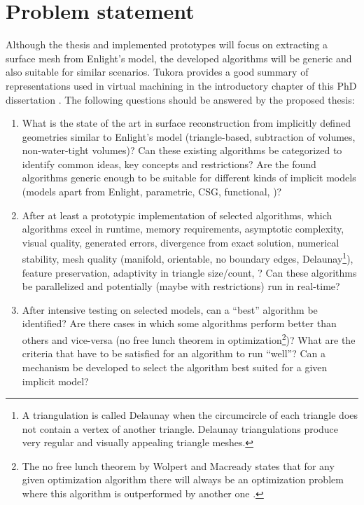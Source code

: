 
\section{Problem statement}

Although the thesis and implemented prototypes will focus on extracting a surface mesh from Enlight's model, the developed algorithms will be generic and also suitable for similar scenarios. Tukora provides a good summary of representations used in virtual machining in the introductory chapter of this PhD dissertation \cite{virtual_machining_review}.
The following questions should be answered by the proposed thesis:

\begin{enumerate}
	\item What is the state of the art in surface reconstruction from implicitly defined geometries similar to Enlight's model (triangle-based, subtraction of volumes, non-water-tight volumes)? Can these existing algorithms be categorized to identify common ideas, key concepts and restrictions? Are the found algorithms generic enough to be suitable for different kinds of implicit models (models apart from Enlight, parametric, CSG, functional, \etc)?
	
	\item After at least a prototypic implementation of selected algorithms, which algorithms excel in runtime, memory requirements, asymptotic complexity, visual quality, generated errors, divergence from exact solution, numerical stability, mesh quality (manifold, orientable, no boundary edges, Delaunay\footnote{A triangulation is called Delaunay when the circumcircle of each triangle does not contain a vertex of another triangle. Delaunay triangulations produce very regular and visually appealing triangle meshes.}), feature preservation, adaptivity in triangle size/count, \etc? Can these algorithms be parallelized and potentially (maybe with restrictions) run in real-time?
	
	\item After intensive testing on selected models, can a \enquote{best} algorithm be identified? Are there cases in which some algorithms perform better than others and vice-versa (\cf no free lunch theorem in optimization\footnote{The no free lunch theorem by Wolpert and Macready states that for any given optimization algorithm there will always be an optimization problem where this algorithm is outperformed by another one \cite{no_free_lunch}. })? What are the criteria that have to be satisfied for an algorithm to run \enquote{well}? Can a mechanism be developed to select the algorithm best suited for a given implicit model?
\end{enumerate}
